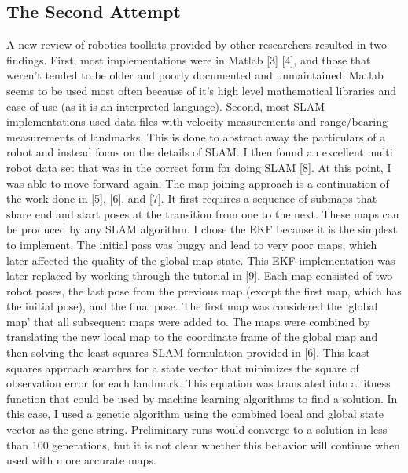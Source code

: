 \subsection{The Second Attempt}
A new review of robotics toolkits provided by other researchers resulted in two findings.  First, most implementations were in Matlab [3] [4], and those that weren’t tended to be older and poorly documented and unmaintained.  Matlab seems to be used most often because of it’s high level mathematical libraries and ease of use (as it is an interpreted language).  Second, most SLAM implementations used data files with velocity measurements and range/bearing measurements of landmarks.  This is done to abstract away the particulars of a robot and instead focus on the details of SLAM.  I then found an excellent multi robot data set that was in the correct form for doing SLAM [8].
At this point, I was able to move forward again.  The map joining approach is a continuation of the work done in [5], [6], and [7].  It first requires a sequence of submaps that share end and start poses at the transition from one to the next.  These maps can be produced by any SLAM algorithm.  I chose the EKF because it is the simplest to implement.  The initial pass was buggy and lead to very poor maps, which later affected the quality of the global map state.  This EKF implementation was later replaced by working through the tutorial in [9].  
Each map consisted of two robot poses, the last pose from the previous map (except the first map, which has the initial pose), and the final pose.  The first map was considered the ‘global map’ that all subsequent maps were added to.  The maps were combined by translating the new local map to the coordinate frame of the global map and then solving the least squares SLAM formulation provided in [6].  This least squares approach searches for a state vector that minimizes the square of observation error for each landmark.  This equation was translated into a fitness function that could be used by machine learning algorithms to find a solution.  In this case, I used a genetic algorithm using the combined local and global state vector as the gene string.  Preliminary runs would converge to a solution in less than 100 generations, but it is not clear whether this behavior will continue when used with more accurate maps.  
